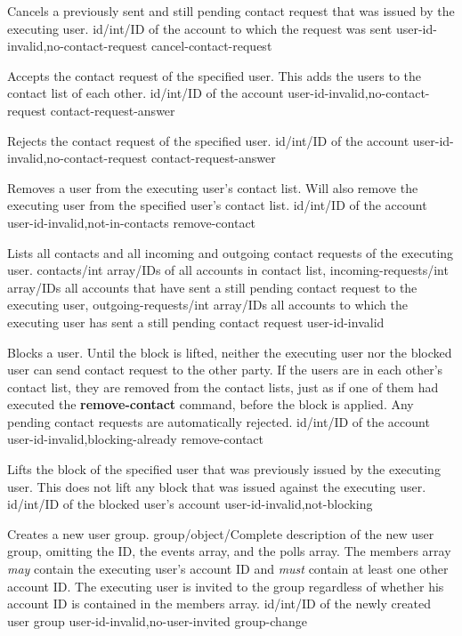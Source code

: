 \documentclass[parskip=full,11pt]{scrartcl}
\begin{document}
{Cancels a previously sent and still pending contact request that was issued
by the executing user.}
{id/int/ID of the account to which the request was sent}
{}
{user-id-invalid,no-contact-request}
{cancel-contact-request}

{Accepts the contact request of the specified user.
This adds the users to the contact list of each other.}
{id/int/ID of the account}
{}
{user-id-invalid,no-contact-request}
{contact-request-answer}

{Rejects the contact request of the specified user.}
{id/int/ID of the account}
{}
{user-id-invalid,no-contact-request}
{contact-request-answer}

{Removes a user from the executing user's contact list.
Will also remove the executing user from the specified user's contact list.}
{id/int/ID of the account}
{}
{user-id-invalid,not-in-contacts}
{remove-contact}

{Lists all contacts and all incoming and outgoing contact requests of the
executing user.}
{}
{contacts/int array/IDs of all accounts in contact list,
incoming-requests/int array/IDs all accounts that have sent a still pending
contact request to the executing user,
outgoing-requests/int array/IDs all accounts to which the executing user has
sent a still pending contact request}
{user-id-invalid}
{}

{Blocks a user.
Until the block is lifted, neither the executing user nor the blocked user can
send contact request to the other party.
If the users are in each other's contact list, they are removed from the
contact lists, just as if one of them had executed the \textbf{remove-contact}
command, before the block is applied.
Any pending contact requests are automatically rejected.}
{id/int/ID of the account}
{}
{user-id-invalid,blocking-already}
{remove-contact}

{Lifts the block of the specified user that was previously issued by the
executing user.
This does not lift any block that was issued against the executing user.}
{id/int/ID of the blocked user's account}
{}
{user-id-invalid,not-blocking}
{}

{Creates a new user group.}
{group/object/Complete description of the new user group{,} omitting the ID{,}
the events array{,} and the polls array.
The members array \textit{may} contain the executing user's account ID and
\textit{must} contain at least one other account ID.
The executing user is invited to the group regardless of whether his account
ID is contained in the members array.}
{id/int/ID of the newly created user group}
{user-id-invalid,no-user-invited}
{group-change}
\end{document}
